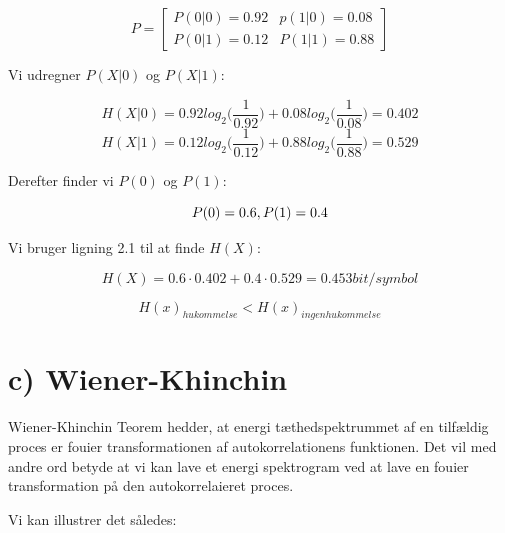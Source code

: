 \[P= \left[ \begin{array}{ccc}
P(0|0) = 0.92 & p(1|0) = 0.08   \\
P(0|1) = 0.12  & P(1|1) = 0.88  \end{array} \right]\] 

Vi udregner $P(X|0)$ og $P(X|1)$:

\begin{equation}
H(X|0)=0.92log_2 \bigg(\frac{1}{0.92}\bigg)+0.08log_2\bigg(\frac{1}{0.08}\bigg) = 0.402
\end{equation}
\begin{equation}
H(X|1)=0.12log_2 \bigg(\frac{1}{0.12}\bigg)+0.88log_2\bigg(\frac{1}{0.88}\bigg) = 0.529
\end{equation}

Derefter finder vi $P(0)$ og $P(1)$:

\begin{equation}
P(0) = 0.6 \\,\\P(1) = 0.4
\end{equation}

Vi bruger ligning 2.1 til at finde $H(X)$:

 \begin{equation}
H(X) = 0.6\cdot 0.402+0.4 \cdot 0.529 = 0.453 bit/symbol
\end{equation} 



\begin{equation}
H(x)_{hukommelse}<H(x)_{ingen hukommelse}
\end{equation}



\section{c) Wiener-Khinchin}

Wiener-Khinchin Teorem hedder, at energi tæthedspektrummet af en tilfældig proces er fouier transformationen af autokorrelationens funktionen. Det vil med andre ord betyde at vi kan lave et energi spektrogram ved at lave en fouier transformation på den autokorrelaieret proces.
 
Vi kan illustrer det således:\\




